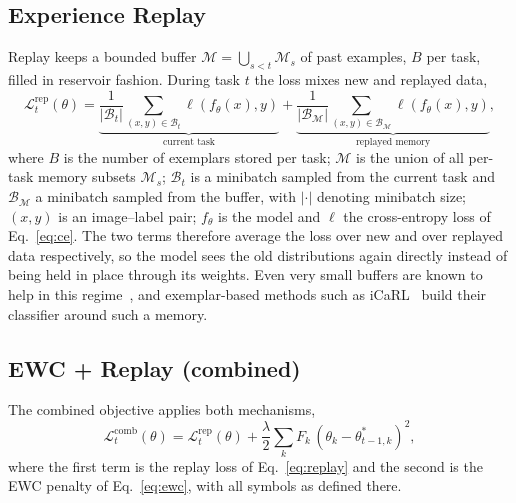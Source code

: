 \documentclass[11pt]{article}
\begin{document}
\subsection{Experience Replay}
Replay keeps a bounded buffer $\mathcal{M}=\bigcup_{s<t}\mathcal{M}_s$ of past
examples, $B$ per task, filled in reservoir fashion. During task $t$ the loss
mixes new and replayed data,
\begin{equation}
\mathcal{L}^{\text{rep}}_t(\theta)=
\underbrace{\frac{1}{|\mathcal{B}_t|}\!\!\sum_{(x,y)\in\mathcal{B}_t}\!\!
   \ell(f_\theta(x),y)}_{\text{current task}}
+\underbrace{\frac{1}{|\mathcal{B}_\mathcal{M}|}\!\!
   \sum_{(x,y)\in\mathcal{B}_\mathcal{M}}\!\!\ell(f_\theta(x),y)}_{\text{replayed memory}},
\label{eq:replay}
\end{equation}
where $B$ is the number of exemplars stored per task; $\mathcal{M}$ is the union
of all per-task memory subsets $\mathcal{M}_s$; $\mathcal{B}_t$ is a minibatch
sampled from the current task and $\mathcal{B}_\mathcal{M}$ a minibatch sampled
from the buffer, with $|\cdot|$ denoting minibatch size; $(x,y)$ is an
image--label pair; $f_\theta$ is the model and $\ell$ the cross-entropy loss of
Eq.~\eqref{eq:ce}. The two terms therefore average the loss over new and over
replayed data respectively, so the model sees the old distributions again
directly instead of being held in place through its weights. Even very small buffers are known to help in this
regime~\cite{chaudhry2019tiny,lopezpaz2017}, and exemplar-based methods such as
iCaRL~\cite{rebuffi2017icarl} build their classifier around such a memory.

\subsection{EWC + Replay (combined)}
The combined objective applies both mechanisms,
\begin{equation}
\mathcal{L}^{\text{comb}}_t(\theta)=\mathcal{L}^{\text{rep}}_t(\theta)
+\frac{\lambda}{2}\sum_k F_k\,(\theta_k-\theta^{*}_{t-1,k})^2 ,
\label{eq:comb}
\end{equation}
where the first term is the replay loss of Eq.~\eqref{eq:replay} and the second
is the EWC penalty of Eq.~\eqref{eq:ewc}, with all symbols as defined there.

\end{document}
